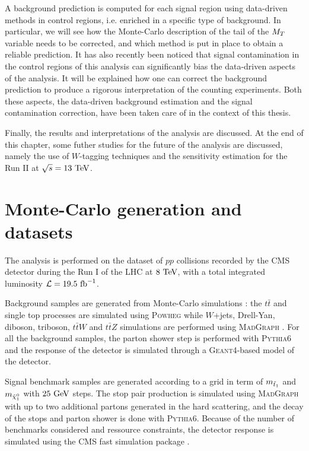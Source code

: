     A background prediction is computed for each signal region using data-driven methods
    in control regions, i.e. enriched in a specific type of background. In particular, we
    will see how the Monte-Carlo description of the tail of the $M_T$ variable needs to be
    corrected, and which method is put in place to obtain a reliable prediction.
    It has also recently been noticed that signal contamination in the control regions of
    this analysis can significantly bias the data-driven aspects of the analysis. It will
    be explained how one can correct the background prediction to produce a rigorous
    interpretation of the counting experiments. Both these aspects, the data-driven
    background estimation and the signal contamination correction, have been taken care
    of in the context of this thesis.

    Finally, the results and interpretations of the analysis are discussed. At the end
    of this chapter, some futher studies for the future of the analysis are discussed,
    namely the use of $W$-tagging techniques and the sensitivity estimation for the Run II
    at $\sqrt{s} = 13~\text{TeV}$.

    \section{Monte-Carlo generation and datasets}

    The analysis is performed on the dataset of $pp$ collisions recorded by the CMS detector
    during the Run I of the LHC at $8~\text{TeV}$, with a total integrated luminosity
    $\mathcal{L} = 19.5~\text{fb}^{-1}$.

    Background samples are generated from Monte-Carlo simulations : the $t\bar{t}$ and
    single top processes are simulated using \textsc{Powheg} \cite{Powheg} while $W$+jets,
    Drell-Yan, diboson, triboson, $t\bar{t}W$ and $t\bar{t}Z$ simulations are performed
    using \textsc{MadGraph} \cite{Madgraph}. For all the background samples, the
    parton shower step is performed with \textsc{Pythia}6 \cite{Pythia} and the response of
    the detector is simulated through a \textsc{Geant4}-based model of the detector.

    Signal benchmark samples are generated according to a grid in term of $m_{\tilde{t}_1}$
    and $m_{\tilde{\chi}_1^0}$ with $25~\text{GeV}$ steps. The stop pair production is simulated
    using \textsc{MadGraph} with up to two additional partons generated in the hard scattering,
    and the decay of the stops and parton shower is done with \textsc{Pythia6}. Because
    of the number of benchmarks considered and ressource constraints, the detector
    response is simulated using the CMS fast simulation package \cite{FastSim}.

